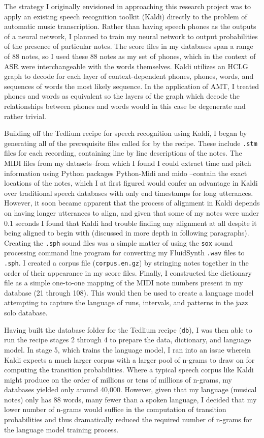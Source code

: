 \documentclass[conference]{IEEEtran}
\begin{document}
The strategy I originally envisioned in approaching this research project was to apply an existing speech recognition toolkit (Kaldi) directly to the problem of automatic music transcription. Rather than having speech phones as the outputs of a neural network, I planned to train my neural network to output probabilities of the presence of particular notes. The score files in my databases span a range of 88 notes, so I used these 88 notes as my set of phones, which in the context of ASR were interchangeable with the words themselves. Kaldi utilizes an HCLG graph to decode for each layer of context-dependent phones, phones, words, and sequences of words the most likely sequence. In the application of AMT, I treated phones and words as equivalent so the layers of the graph which decode the relationships between phones and words would in this case be degenerate and rather trivial.

Building off the Tedlium recipe for speech recognition using Kaldi, I began by generating all of the prerequisite files called for by the recipe. These include \texttt{.stm} files for each recording, containing line by line descriptions of the notes. The MIDI files from my datasets--from which I found I could extract time and pitch information using Python packages Python-Midi and mido \cite{bjorn} \cite{vishnu} --contain the exact locations of the notes, which I at first figured would confer an advantage in Kaldi over traditional speech databases with only end timestamps for long utterances. However, it soon became apparent that the process of alignment in Kaldi depends on having longer utterances to align, and given that some of my notes were under 0.1 seconds I found that Kaldi had trouble finding any alignment at all despite it being aligned to begin with (discussed in more depth in following paragraphs). Creating the \texttt{.sph} sound files was a simple matter of using the \texttt{sox} sound processing command line program for converting my FluidSynth \texttt{.wav} files to \texttt{.sph}. I created a corpus file (\texttt{corpus.en.gz}) by stringing notes together in the order of their appearance in my score files. Finally, I constructed the dictionary file as a simple one-to-one mapping of the MIDI note numbers present in my database (21 through 108). This would then be used to create a language model attempting to capture the language of runs, intervals, and patterns in the jazz solo database.

Having built the database folder for the Tedlium recipe (\texttt{db}), I was then able to run the recipe stages 2 through 4 to prepare the data, dictionary, and language model. In stage 5, which trains the language model, I ran into an issue wherein Kaldi expects a much larger corpus with a larger pool of n-grams to draw on for computing the transition probabilities. Where a typical speech corpus like Kaldi might produce on the order of millions or tens of millions of n-grams, my databases yielded only around 40,000. However, given that my language (musical notes) only has 88 words, many fewer than a spoken language, I decided that my lower number of n-grams would suffice in the computation of transition probabilities and thus dramatically reduced the required number of n-grams for the language model training process.
\end{document}
